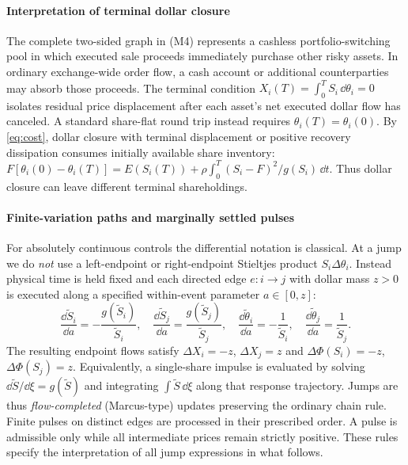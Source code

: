 \documentclass[review,hidelinks,onefignum,onetabnum]{siamonline250211}
\begin{document}
\paragraph{Interpretation of terminal dollar closure}
The complete two-sided graph in (M4) represents a cashless portfolio-switching pool in which executed sale proceeds immediately purchase other risky assets. In ordinary exchange-wide order flow, a cash account or additional counterparties may absorb those proceeds. The terminal condition $X_i(T)=\int_0^T S_i\,\dd\theta_i=0$ isolates residual price displacement after each asset's net executed dollar flow has canceled. A standard share-flat round trip instead requires $\theta_i(T)=\theta_i(0)$. By \eqref{eq:cost}, dollar closure with terminal displacement or positive recovery dissipation consumes initially available share inventory: $F[\theta_i(0)-\theta_i(T)]=E(S_i(T))+\rho\int_0^T(S_i-F)^2/g(S_i)\,\dd t$. Thus dollar closure can leave different terminal shareholdings.

\paragraph{Finite-variation paths and marginally settled pulses}
For absolutely continuous controls the differential notation is classical. At a jump we do \emph{not} use a left-endpoint or right-endpoint Stieltjes product $S_i\Delta\theta_i$. Instead physical time is held fixed and each directed edge $e:i\to j$ with dollar mass $z>0$ is executed along a specified within-event parameter $a\in[0,z]$:
\begin{equation}\label{eq:pulse-flow}
\frac{\dd \widetilde S_i}{\dd a}=-\frac{g(\widetilde S_i)}{\widetilde S_i},\quad
\frac{\dd \widetilde S_j}{\dd a}=\frac{g(\widetilde S_j)}{\widetilde S_j},\quad
\frac{\dd\widetilde\theta_i}{\dd a}=-\frac{1}{\widetilde S_i},\quad
\frac{\dd\widetilde\theta_j}{\dd a}=\frac{1}{\widetilde S_j}.
\end{equation}
The resulting endpoint flows satisfy $\Delta X_i=-z$, $\Delta X_j=z$ and $\Delta\Phi(S_i)=-z$, $\Delta\Phi(S_j)=z$. Equivalently, a single-share impulse is evaluated by solving $\dd\widetilde S/\dd\xi=g(\widetilde S)$ and integrating $\int\widetilde S\,\dd\xi$ along that response trajectory. Jumps are thus \emph{flow-completed} (Marcus-type) updates preserving the ordinary chain rule. Finite pulses on distinct edges are processed in their prescribed order. A pulse is admissible only while all intermediate prices remain strictly positive. These rules specify the interpretation of all jump expressions in what follows.
\end{document}

